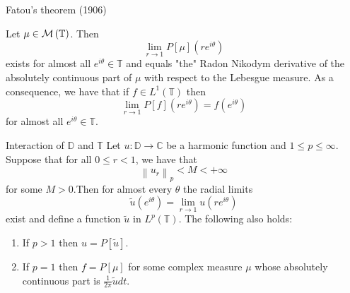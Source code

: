 \documentclass{beamer}
\numberwithin{equation}{subsection}
\newcommand{\C}{\mathbb C}
\newcommand{\D}{\mathbb D}
\newcommand{\T}{\mathbb T}
\newcommand{\calM}{{\cal M}}
\newcommand{\norm}[1]{\left\lVert #1 \right\rVert}
\begin{document}
 \begin{frame}{Fatou's theorem (1906)}
     \begin{corollary}
     Let $\mu \in \calM \left( \T \right)$. Then
     \begin{equation*}
	 \lim_{r\to 1} P[\mu]\left( re^{i\theta} \right)
     \end{equation*}
     exists for almost all $e^{i\theta} \in \T$ and equals "the" Radon Nikodym derivative of the absolutely continuous part of $\mu$ with respect to the Lebesgue measure. As a consequence, we have that if $f\in L^{1} \left( \T \right)$ then 
     \begin{equation*}
	 \lim_{r\to 1} P[f] \left( re^{i\theta} \right) = f\left( e^{i\theta} \right)
     \end{equation*}
     for almost all $e^{i\theta} \in \T$.
     \label{cor:Fatou}
 \end{corollary}
\end{frame}
\begin{frame}{Interaction of $\D$ and $\T$}
    Let $u: \D \to \C$ be a harmonic function and $1\le p \le \infty$. Suppose that for all $0\le r < 1$, we have that
    \begin{equation*}
	\norm{u_{r}}_{p} < M < +\infty
    \end{equation*}
    for some $M>0$.\pause Then for almost every $\theta$ the radial limits 
    \begin{equation*}
	\tilde {u} (e^{i\theta} ) = \lim_{r\to 1} u\left( re^{i\theta} \right)
    \end{equation*}
    exist and define a function $\tilde u$ in $L^{p} \left( \T \right)$. The following also holds: \pause
    \begin{enumerate}
	\item If $p>1$ then $u=P[\tilde{u}]$. \pause
	\item If $p=1$ then $f=P[\mu]$ for some complex measure $\mu$ whose absolutely continuous part is $\frac{1}{2\pi}\tilde{u}dt$.
\end{enumerate}
\end{frame}
\end{document}
